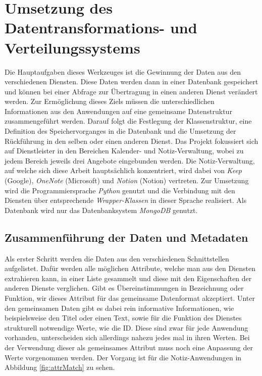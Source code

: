 \chapter{Umsetzung des Datentransformations- und Verteilungssystems}

Die Hauptaufgaben dieses Werkzeuges ist die Gewinnung der Daten aus den verschiedenen Diensten. Diese Daten werden dann in einer Datenbank gespeichert und können bei einer Abfrage zur Übertragung in einen anderen Dienst verändert werden. Zur Ermöglichung dieses Ziels müssen die unterschiedlichen Informationen aus den Anwendungen auf eine gemeinsame Datenstruktur zusammengeführt werden. Darauf folgt die Festlegung der Klassenstruktur, eine Definition des Speichervorganges in die Datenbank und die Umsetzung der Rückführung in den selben oder einen anderen Dienst. Das Projekt fokussiert sich auf Dienstleister in den Bereichen Kalender- und Notiz-Verwaltung, wobei zu jedem Bereich jeweils drei Angebote eingebunden werden. Die Notiz-Verwaltung, auf welche sich diese Arbeit hauptsächlich konzentriert, wird dabei von \textit{Keep} (Google), \textit{OneNote} (Microsoft) und \textit{Notion} (Notion) vertreten. Zur Umsetzung wird die Programmiersprache \textit{Python} genutzt und die Verbindung mit den Diensten über entsprechende \textit{Wrapper-Klassen} in dieser Sprache realisiert. Als Datenbank wird nur das Datenbanksystem \textit{MongoDB} genutzt. 

\section{Zusammenführung der Daten und Metadaten}

Als erster Schritt werden die Daten aus den verschiedenen Schnittstellen aufgelistet. Dafür werden alle möglichen Attribute, welche man aus den Diensten extrahieren kann, in einer Liste gesammelt und diese mit den Eigenschaften der anderen Dienste verglichen. Gibt es Übereinstimmungen in Bezeichnung oder Funktion, wir dieses Attribut für das gemeinsame Datenformat akzeptiert. Unter den gemeinsamen Daten gibt es dabei rein informative Informationen, wie beispielsweise den Titel oder einen Text, sowie für die Funktion des Dienstes strukturell notwendige Werte, wie die ID. Diese sind zwar für jede Anwendung vorhanden, unterscheiden sich allerdings nahezu jedes mal in ihren Werten. Bei der Verwendung dieser als gemeinsames Attribut muss noch eine Anpassung der Werte vorgenommen werden. Der Vorgang ist für die Notiz-Anwendungen in Abbildung \ref{fig:attrMatch} zu sehen.\\

